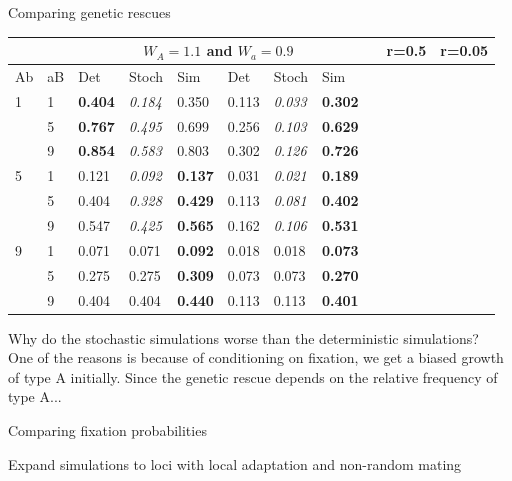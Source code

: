 \documentclass{beamer}
\begin{document}
\begin{frame}{Comparing genetic rescues}

\begin{tabular}{l | l | lll | lll}
&  & \multicolumn{6}{c}{$W_A=1.1$ and $W_a = 0.9$}
&  & \multicolumn{3}{c}{r=0.5} & \multicolumn{3}{c}{r=0.05} \\
\midrule
Ab& aB & Det & Stoch & Sim & Det & Stoch & Sim \\
\midrule
1 & 1 & \textbf{0.404} &\textit{0.184}& 0.350         & 0.113 & \textit{0.033} & \textbf{0.302} \\
     & 5 & \textbf{0.767} & \textit{0.495} & 0.699   & 0.256 & \textit{0.103} & \textbf{0.629}  \\
     & 9 & \textbf{0.854} & \textit{0.583} & 0.803   & 0.302 & \textit{0.126} &  \textbf{0.726}\\
     \midrule
5 & 1 & 0.121 & \textit{0.092} &  \textbf{0.137}         & 0.031 & \textit{0.021} & \textbf{0.189} \\
     & 5 & 0.404 & \textit{0.328} & \textbf{0.429}       & 0.113 & \textit{0.081} & \textbf{0.402}\\
     & 9 & 0.547 & \textit{0.425} & \textbf{0.565}    & 0.162 & \textit{0.106} & \textbf{0.531} \\
     \midrule
9 & 1 & 0.071 & 0.071 & \textbf{0.092}         & 0.018 & 0.018 & \textbf{0.073}\\
     & 5 & 0.275 & 0.275 & \textbf{0.309}  & 0.073 & 0.073 & \textbf{0.270}  \\
     & 9 & 0.404 & 0.404 & \textbf{0.440}   & 0.113 & 0.113 & \textbf{0.401} \\
\end{tabular}
\end{frame}

\begin{frame}{}
    Why do the stochastic simulations worse than the deterministic simulations? \\
    One of the reasons is because of conditioning on fixation, we get a biased growth of type A initially. Since the genetic rescue depends on the relative frequency of type A...
\end{frame}

\begin{frame}{Comparing fixation probabilities}
    
\end{frame}

\begin{frame}{Expand simulations to loci with local adaptation and non-random mating}
    
\end{frame}
\end{document}
